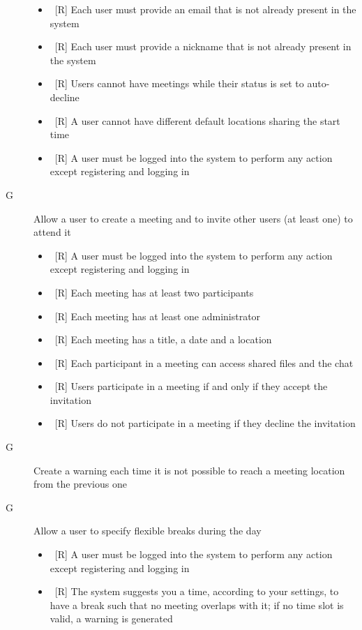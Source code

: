 \begin{description}
\begin{itemize}
\item~[R] Each user must provide an email that is not already present in the system
\item~[R] Each user must provide a nickname that is not already present in the system
\item~[R] Users cannot have meetings while their status is set to auto-decline
\item~[R] A user cannot have different default locations sharing the start time
\item~[R] A user must be logged into the system to perform any action except registering and logging in
\end{itemize}

\item[G\thecountReq] Allow a user to create a meeting and to invite other users (at least one) to attend it

\begin{itemize}
\item~[R] A user must be logged into the system to perform any action except registering and logging in
\item~[R] Each meeting has at least two participants
\item~[R] Each meeting has at least one administrator
\item~[R] Each meeting has a title, a date and a location
\item~[R] Each participant in a meeting can access shared files and the chat
\item~[R] Users participate in a meeting if and only if they accept the invitation
\item~[R] Users do not participate in a meeting if they decline the invitation
\end{itemize}

\item[G\thecountReq] Create a warning each time it is not possible to reach a meeting location from the previous one

\item[G\thecountReq] Allow a user to specify flexible breaks during the day

\begin{itemize}
\item~[R] A user must be logged into the system to perform any action except registering and logging in
\item~[R] The system suggests you a time, according to your settings, to have a break such that no meeting overlaps with it; if no time slot is valid, a warning is generated
\end{itemize}


\end{description}
